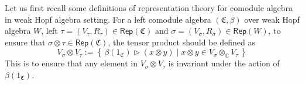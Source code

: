 \documentclass[a4paper,11pt]{article}
\theoremstyle{definition}
\theoremstyle{remark}
\newcommand\eC           {\EuScript{C}}
\newcommand\eM          {\EuScript{M}}
\newcommand\eN         {\EuScript{N}}
\newcommand{\Cbb}{\mathbb{C}}
\newcommand{\Rep}{\mathsf{Rep}}
\newcommand\fC           {\mathfrak{C}}
\begin{document}
Let us first recall some definitions of representation theory for comodule algebra in weak Hopf algebra setting.
For a left comodule algebra $(\mathfrak{C},\beta)$ over weak Hopf algebra $W$, left $\tau=(V_{\tau},R_{\tau})\in \Rep(\mathfrak{C})$ and $\sigma=(V_{\sigma},R_{\sigma})\in \Rep(W)$, to ensure that $\sigma\otimes \tau \in \Rep(\mathfrak{C})$,  the tensor product should be defined as 
\begin{equation}\label{eq:TensorDef}
    V_{\sigma}\otimes V_{\tau}:=\left\{\,\beta(1_{\fC}) \triangleright ( x\otimes y)\;|\;x\otimes y \in V_{\sigma}\otimes_{\Cbb} V_{\tau} \,\right\}
\end{equation}
This is to ensure that any element in $ V_{\sigma}\otimes V_{\tau}$ is invariant under the action of $\beta(1_{\mathfrak{C}})$.




\end{document}
